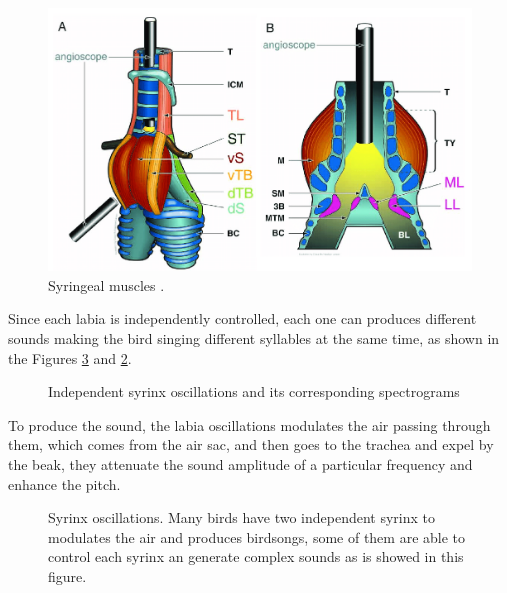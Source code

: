 
\begin{figure}[H]
    \centering
    \includegraphics[scale=0.3]{Images/syrinx_muscles.png}
    \caption{Syringeal muscles \cite{Syrinx_muscles}.}
    \label{fig:Syrinx_muscles}
\end{figure}

Since each labia is independently controlled, each one can produces different sounds making the bird singing different syllables at the same time, as shown in the Figures \ref{fig:syrinx_bird} and \ref{fig:syrinx_gif}. 

\begin{figure}[H]
    \centering
    \caption{Independent syrinx oscillations and its corresponding spectrograms  \cite{birdsongs_cornell}}
    \label{fig:syrinx_gif}
\end{figure}


To produce the sound, the labia oscillations modulates the air passing through them, which comes from the air sac, and then goes to the trachea and expel by the beak, they attenuate the sound amplitude of a particular frequency and enhance the pitch.







\begin{figure}[H]
    \centering
    \caption{Syrinx oscillations. Many birds have two independent syrinx to modulates the air and produces birdsongs, some of them are able to control each syrinx an generate complex sounds as is showed in this figure.}
    \label{fig:syrinx_bird}
\end{figure}







